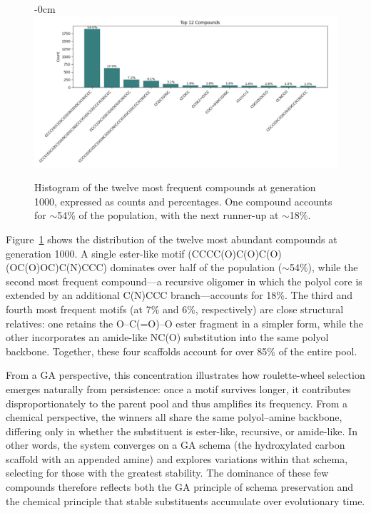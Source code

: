 \documentclass[life,article,submit,pdftex,moreauthors]{Definitions/mdpi}
\begin{document}
\begin{figure}[H]
\begin{adjustwidth}{-\extralength}{0cm}
\centering
\includegraphics[width=\fulllength]{SDA-chem-hist.png}
\end{adjustwidth}
\caption{Histogram of the twelve most frequent compounds at generation 1000, expressed as counts and percentages. One compound accounts for $\sim$54\% of the population, with the next runner-up at $\sim$18\%.}
\label{fig:chem-compound-hist}
\end{figure}

Figure~\ref{fig:chem-compound-hist} shows the distribution of the twelve most abundant compounds at generation 1000. A single ester-like motif (CCCC(O)C(O)C(O)(OC(O)OC)C(N)CCC) dominates over half of the population ($\sim$54\%), while the second most frequent compound---a recursive oligomer in which the polyol core is extended by an additional C(N)CCC branch---accounts for 18\%. The third and fourth most frequent motifs (at 7\% and 6\%, respectively) are close structural relatives: one retains the O–C(=O)–O ester fragment in a simpler form, while the other incorporates an amide-like NC(O) substitution into the same polyol backbone. Together, these four scaffolds account for over 85\% of the entire pool.

From a GA perspective, this concentration illustrates how roulette-wheel selection emerges naturally from persistence: once a motif survives longer, it contributes disproportionately to the parent pool and thus amplifies its frequency. From a chemical perspective, the winners all share the same polyol–amine backbone, differing only in whether the substituent is ester-like, recursive, or amide-like. In other words, the system converges on a GA schema (the hydroxylated carbon scaffold with an appended amine) and explores variations within that schema, selecting for those with the greatest stability. The dominance of these few compounds therefore reflects both the GA principle of schema preservation and the chemical principle that stable substituents accumulate over evolutionary time.
\end{document}
